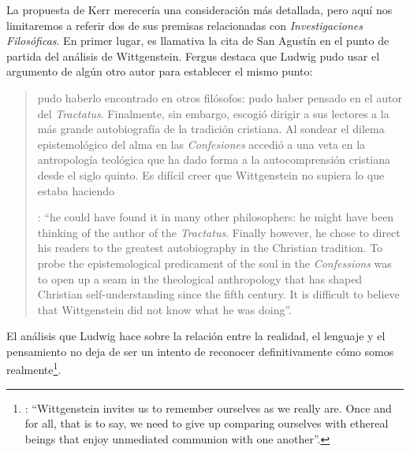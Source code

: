 \label{subsec:comosomos}
La propuesta de Kerr merecería una consideración más detallada, pero aquí nos limitaremos a referir dos de sus premisas relacionadas con \emph{Investigaciones Filosóficas}. En primer lugar, es llamativa la cita de San Agustín en el punto de partida del análisis de Wittgenstein. Fergus destaca que Ludwig pudo usar el argumento de algún otro autor para establecer el mismo punto: \blockquote[{\Cite[42]{kerr1997theo}}: \enquote{he could have found it in many other philosophers: he might have been thinking of the author of the \emph{Tractatus}. Finally however, he chose to direct his readers to the greatest autobiography in the Christian tradition. To probe the epistemological predicament of the soul in the \emph{Confessions} was to open up a seam in the theological anthropology that has shaped Christian self-understanding since the fifth century. It is difficult to believe that Wittgenstein did not know what he was doing}.]{pudo haberlo encontrado en otros filósofos: pudo haber pensado en el autor del \emph{Tractatus}. Finalmente, sin embargo, escogió dirigir a sus lectores a la más grande autobiografía de la tradición cristiana. Al sondear el dilema epistemológico del alma en las \emph{Confesiones} accedió a una veta en la antropología teológica que ha dado forma a la autocomprensión cristiana desde el siglo quinto. Es difícil creer que Wittgenstein no supiera lo que estaba haciendo}. El análisis que Ludwig hace sobre la relación entre la realidad, el lenguaje y el pensamiento no deja de ser un intento de reconocer definitivamente cómo somos realmente\footnote{\cite[Cf.][23]{kerr1997theo}: \enquote{Wittgenstein invites us to remember ourselves as we really are. Once and for all, that is to say, we need to give up comparing ourselves with ethereal beings that enjoy unmediated communion with one another}.}.

